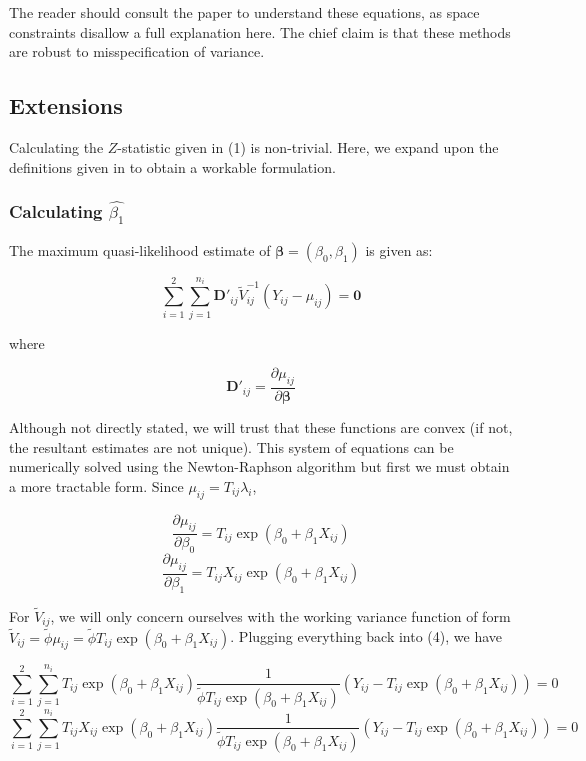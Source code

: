 \documentclass{article}
\begin{document}
The reader should consult the paper to understand these equations, as
space constraints disallow a full explanation here. The chief claim
is that these methods are robust to misspecification of variance.

\subsection{Extensions}

Calculating the $Z$-statistic given in (1) is non-trivial. Here, we expand upon
the definitions given in \cite{igeta2018} to obtain a workable formulation.

\subsubsection{Calculating $\hat{\beta_1}$}

The maximum quasi-likelihood estimate of $\bm{\beta}=(\beta_0, \beta_1)$ is
given as:

\begin{equation}
\sum_{i=1}^2 \sum_{j=1}^{n_i} \bm{D}'_{ij} \tilde{V}_{ij}^{-1}(Y_{ij}-\mu_{ij})
= \bm{0}
\end{equation}

where 

$$
\bm{D}'_{ij} = \frac{\partial \mu_{ij}}{\partial \bm{\beta}}
$$ 

Although not directly stated, we will trust that these functions are convex (if
not, the resultant estimates are not unique). This system of equations can be numerically solved using the 
Newton-Raphson algorithm but first we must obtain a more tractable form. Since $\mu_{ij} = T_{ij}\lambda_i$,

$$
\frac{\partial \mu_{ij}}{\partial \beta_0} = T_{ij} \exp{(\beta_0 + \beta_1 X_{ij})}
$$
$$
\frac{\partial \mu_{ij}}{\partial \beta_1} = T_{ij}X_{ij} \exp{(\beta_0 + \beta_1 X_{ij})}
$$

For $\tilde{V}_{ij}$, we will only concern ourselves with the working variance
function of form $\tilde{V}_{ij} = \tilde{\phi} \mu_{ij} =
\tilde{\phi} T_{ij} \exp{(\beta_0 + \beta_1 X_{ij})}$. Plugging everything back into
(4), we have

$$
\sum_{i=1}^2 \sum_{j=1}^{n_i}  T_{ij} \exp{(\beta_0 + \beta_1 X_{ij})}
\frac{1}{\tilde{\phi} T_{ij} \exp{(\beta_0 + \beta_1 X_{ij})}} 
(Y_{ij} - T_{ij} \exp{(\beta_0 + \beta_1 X_{ij})}) = 0
$$
$$
\sum_{i=1}^2 \sum_{j=1}^{n_i} T_{ij} X_{ij} \exp{(\beta_0 + \beta_1 X_{ij})}
\frac{1}{\tilde{\phi} T_{ij} \exp{(\beta_0 + \beta_1 X_{ij})}} 
(Y_{ij} - T_{ij} \exp{(\beta_0 + \beta_1 X_{ij})}) = 0
$$
\end{document}
